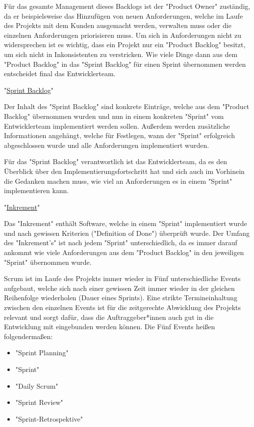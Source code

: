 Für das gesamte Management dieses Backlogs ist der "Product Owner" zuständig, da er beispielsweise das Hinzufügen von neuen Anforderungen, welche im Laufe des Projekts mit dem Kunden ausgemacht werden, verwalten muss oder die einzelnen Anforderungen priorisieren muss. Um sich in Anforderungen nicht zu widersprechen ist es wichtig, dass ein Projekt nur ein "Product Backlog" besitzt, um sich nicht in Inkonsistenten zu verstricken. Wie viele Dinge dann aus dem "Product Backlog" in das "Sprint Backlog" für einen Sprint übernommen werden entscheidet final das Entwicklerteam. \cite{ProductBacklog}

"\underline{Sprint Backlog}"

Der Inhalt des "Sprint Backlog" sind konkrete Einträge, welche aus dem "Product Backlog" übernommen wurden und nun in einem konkreten "Sprint" vom Entwicklerteam implementiert werden sollen. Außerdem werden zusätzliche Informationen angehängt, welche für Festlegen, wann der "Sprint" erfolgreich abgeschlossen wurde und alle Anforderungen implementiert wurden. 

Für das "Sprint Backlog" verantwortlich ist das Entwicklerteam, da es den Überblick über den Implementierungsfortschritt hat und sich auch im Vorhinein die Gedanken machen muss, wie viel an Anforderungen es in einem "Sprint" implementieren kann. \cite{SprintBacklog}

"\underline{Inkrement}"

Das "Inkrement" enthält Software, welche in einem "Sprint" implementiert wurde und nach gewissen Kriterien ("Definition of Done") überprüft wurde. Der Umfang des "Inkrement's" ist nach jedem "Sprint" unterschiedlich, da es immer darauf ankommt wie viele Anforderungen aus dem "Product Backlog" in den jeweiligen "Sprint" übernommen wurde. \cite{Inkrement}


Scrum ist im Laufe des Projekts immer wieder in Fünf unterschiedliche Events aufgebaut, welche sich nach einer gewissen Zeit immer wieder in der gleichen Reihenfolge wiederholen (Dauer eines Sprints). Eine strikte Termineinhaltung zwischen den einzelnen Events ist für die zeitgerechte Abwicklung des Projekts relevant und sorgt dafür, dass die Auftraggeber*innen auch gut in die Entwicklung mit eingebunden werden können. Die Fünf Events heißen folgendermaßen:

\begin{itemize}
    \item "Sprint Planning"
    \item "Sprint"
    \item "Daily Scrum"
    \item "Sprint Review"
    \item "Sprint-Retrospektive"
\end{itemize}

